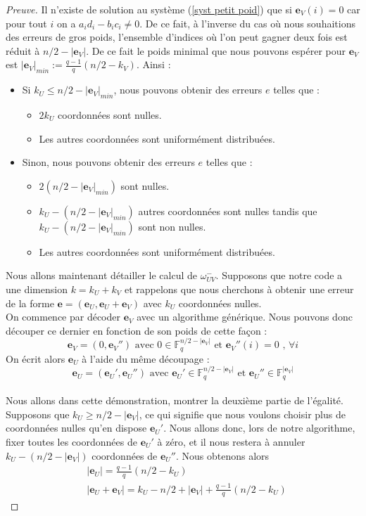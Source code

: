 \documentclass[12pt]{article}
\theoremstyle{plain}
\theoremstyle{definition}
\newcommand{\F}{\mathbb{F}}
\newcommand{\e}{\mathbf{e}}
\begin{document}
\begin{proof}[Preuve]
Il n'existe de solution au système (\ref{syst petit poid}) que si $\e_V(i)=0$ car pour tout $i$ on a $a_id_i -b_ic_i \neq 0$. De ce fait, à l'inverse du cas où nous souhaitions des erreurs de gros poids, l'ensemble d'indices où l'on peut gagner deux fois est réduit à $n/2 - |\e_V|$. De ce fait le poids minimal que nous pouvons espérer pour $\e_V$ est $|\e_V|_{min} := \frac{q-1}{q}(n/2-k_V)$. Ainsi :
\begin{itemize}
\item Si $k_U \leq n/2 - |\e_V|_{min}$, nous pouvons obtenir des erreurs $e$ telles que :
	\begin{itemize}
	\item $2k_U$ coordonnées sont nulles.
	\item Les autres coordonnées sont uniformément distribuées.
	\end{itemize}
\item Sinon, nous pouvons obtenir des erreurs $e$ telles que :
	\begin{itemize}
	\item $2(n/2 - |\e_V|_{min})$ sont nulles.
	\item $k_U - (n/2 - |\e_V|_{min})$ autres coordonnées sont nulles tandis que $k_U - (n/2 - |\e_V|_{min})$ sont non nulles.
	\item Les autres coordonnées sont uniformément distribuées.
	\end{itemize}
\end{itemize} 


\noindent Nous allons maintenant détailler le calcul de $\omega_{UV}^-$. Supposons que notre code a une dimension $k = k_U + k_V$ et rappelons que nous cherchons à obtenir une erreur de la forme $\e = (\e_U,\e_U + \e_V)$ avec $k_U$ coordonnées nulles.\\
\noindent On commence par décoder $\e_V$ avec un algorithme générique. 
Nous pouvons donc découper ce dernier en fonction de son poids de cette façon :\\$$ \e_V = (0, \e_V'') \text{ avec } 0 \in \F_q^{n/2-|\e_V|} \text{ et } \e_V''(i) = 0\text{ , } \forall i$$
\noindent On écrit alors $\e_U$ à l'aide du même découpage : 
$$\e_U = (\e_U', \e_U'') \text{ avec } \e_U' \in \F_q^{n/2-|\e_V|} \text{ et } \e_U'' \in \F_q^{|\e_V|}$$\\
\noindent Nous allons dans cette démonstration, montrer la deuxième partie de l'égalité. Supposons que $k_U \geq n/2 - |\e_V|$, ce qui signifie que nous voulons choisir plus de coordonnées nulles qu'en dispose $\e_U'$. 
Nous allons donc, lors de notre algorithme, fixer toutes les coordonnées de $\e_U'$ à zéro, et il nous restera à annuler $k_U - (n/2 -|\e_V|)$ coordonnées de $\e_U''$.
Nous obtenons alors 
\begin{equation*}
\begin{split}
&|\e_U| = \frac{q-1}{q}(n/2-k_U) \\
&|\e_U + \e_V| = k_U - n/2 + |\e_V| + \frac{q-1}{q}(n/2 -k_U)
\end{split}
\end{equation*}


\end{proof}
\end{document}
